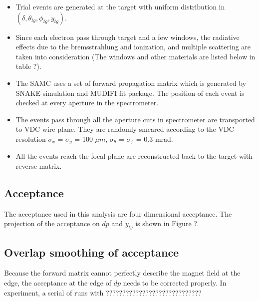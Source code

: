 \begin{itemize}
\item Trial events are generated at the target with uniform distribution in $(\delta,\theta_{tg},\phi_{tg},y_{tg})$.
\item
Since each electron pass through target and a few windows, the radiative effects due to the bremsstrahlung
and ionization, and multiple scattering are taken into consideration (The windows and other materials are
listed below in table ?).

\item The SAMC uses a set of forward propagation matrix which is generated by SNAKE simulation
and MUDIFI fit package. The position of each event is checked at every aperture in the spectrometer.

\item The events pass through all the aperture cuts in spectrometer are transported to VDC wire plane.
They are randomly smeared according to the VDC resolution $\sigma_x$ = $\sigma_y$ = 100 $\mu m$,
$\sigma_\theta$ = $\sigma_\phi$ = 0.3 mrad. 

\item All the events reach the focal plane are reconstructed back to the target with reverse matrix.

\end{itemize}

\subsection{Acceptance}

The acceptance used in this analysis are four dimensional acceptance. The projection of the acceptance
on $dp$ and $y_{tg}$ is shown in Figure ?. 

\subsection{Overlap smoothing of acceptance}
Because the forward matrix cannot perfectly describe the magnet field at the edge, the acceptance
at the edge of $dp$ needs to be corrected properly. In experiment, a serial of runs with 
?????????????????????????????

